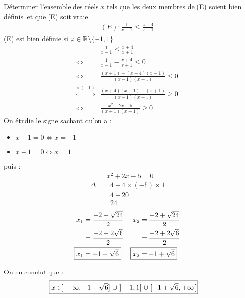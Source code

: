\begin{exercice}
    Déterminer l'ensemble des réels $x$ tels que les deux membres de (E) soient bien définis, et que (E) soit vraie
\begin{align*}
    (E) : \frac{1}{x-1} \leq \frac{x+4}{x+1}
\end{align*}
(E) est bien définie si $x \in \mathbb{R} \backslash \{-1,1\}$
\begin{align*}
    &\frac{1}{x-1} \leq \frac{x+4}{x+1} \\
    \iff &\frac{1}{x-1} - \frac{x+4}{x+1} \leq 0 \\
    \iff &\frac{(x+1) - (x+4)(x-1)}{(x-1)(x+1)} \leq 0 \\
    \overset{\times (-1)}{\iff} &\frac{(x+4)(x-1) - (x+1)}{(x-1)(x+1)} \geq 0 \\
    \iff &\frac{x^2 + 2x - 5}{(x+1)(x-1)} \geq 0
\end{align*}
On étudie le signe sachant qu'on a : 
\begin{itemize}
    \item $x+1 = 0 \iff x = -1$
    \item $x-1 = 0 \iff x = 1$
\end{itemize}
puis :
\begin{align*}
    &x^2 + 2x - 5 = 0 
\end{align*}
\begin{align*}
    \Delta &= 4 - 4 \times (-5) \times 1 \\
    &= 4 + 20 \\
    &= 24
\end{align*}
\begin{align*}
    x_1 &= \frac{-2 - \sqrt{24}}{2} & x_2 &= \frac{-2 + \sqrt{24}}{2} \\
        &= \frac{-2 - 2\sqrt{6}}{2} &     &= \frac{-2 + 2\sqrt{6}}{2} \\
    \Aboxed{x_1 &= -1 - \sqrt{6}} & \Aboxed{x_2 &= -1 + \sqrt{6}}
\end{align*}

\begin{figure}[h!]
    \centering
\end{figure}
\clearpage
On en conclut que :
\begin{align*}
    \Aboxed{x \in ]-\infty, -1-\sqrt{6}]\ \cup \ ]-1,1[\ \cup \ [-1+\sqrt{6}, +\infty[}
\end{align*}
\end{exercice}


